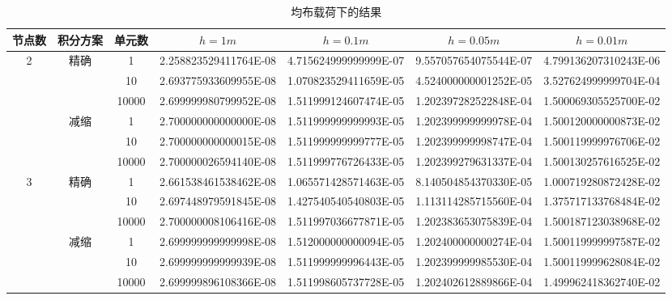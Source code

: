\documentclass[UTF8,c5size]{ctexart}
\begin{document}
\begin{table*}[htbp]
    \footnotesize
    \begin{center}
        \caption{均布载荷下的结果}
        \label{表1}
        \begin{tabular}{|c|c|c|c|c|c|c|}
            \hline
            节点数&积分方案&单元数&$h=1m$&$h=0.1m$&$h=0.05m$&$h=0.01m$\\
            \hline
            \multirow{6}{*}{2}&\multirow{3}{*}{精确}&
            1&2.258823529411764E-08&4.715624999999999E-07&9.557057654075544E-07&4.799136207310243E-06\\
            \cline{3-7}
            &&
            10&2.693775933609955E-08&1.070823529411659E-05&4.524000000001252E-05&3.527624999999704E-04\\
            \cline{3-7}
            &&
            10000&2.699999980799952E-08&1.511999124607474E-05&1.202397282522848E-04&1.500069305525700E-02\\
            \cline{2-7}
            &\multirow{3}{*}{减缩}&
            1&2.700000000000000E-08&1.511999999999993E-05&1.202399999999978E-04&1.500120000000873E-02\\
            \cline{3-7}
            &&
            10&2.700000000000015E-08&1.511999999999777E-05&1.202399999998747E-04&1.500119999976706E-02\\
            \cline{3-7}
            &&
            10000&2.700000026594140E-08&1.511999776726433E-05&1.202399279631337E-04&1.500130257616525E-02\\
            \hline
    
            \multirow{6}{*}{3}&\multirow{3}{*}{精确}&
            1&2.661538461538462E-08&1.065571428571463E-05&8.140504854370330E-05&1.000719280872428E-02\\
            \cline{3-7}
            &&
            10&2.697448979591845E-08&1.427540540540803E-05&1.113114285715560E-04&1.375717133768484E-02\\
            \cline{3-7}
            &&
            10000&2.700000008106416E-08&1.511997036677871E-05&1.202383653075839E-04&1.500187123038968E-02\\
            \cline{2-7}
            &\multirow{3}{*}{减缩}&
            1&2.699999999999998E-08&1.512000000000094E-05&1.202400000000274E-04&1.500119999997587E-02\\
            \cline{3-7}
            &&
            10&2.699999999999939E-08&1.511999999996443E-05&1.202399999985530E-04&1.500119999628084E-02\\
            \cline{3-7}
            &&
            10000&2.699999896108366E-08&1.511998605737728E-05&1.202402612889866E-04&1.499962418362740E-02\\
            \hline
    

\end{tabular}
\end{center}
\end{table*}
\end{document}
